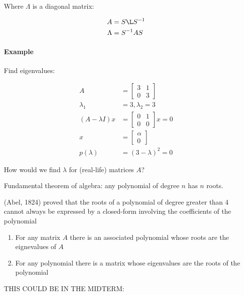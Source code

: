 Where $\Lambda$ is a diagonal matrix:

\begin{align*}
    A &= S \L S^{-1} \\
    \Lambda &= S^{-1} A S
\end{align*}

\paragraph{Example} Find eigenvalues:

\begin{align*}
    A &=
  \begin{bmatrix}
    3 & 1 \\ 0 & 3
  \end{bmatrix} \\
  \lambda_{1} &= 3, \lambda_{2} = 3 \\
  (A- \lambda I)x &=
  \begin{bmatrix}
    0 & 1 \\ 0 & 0
  \end{bmatrix}
  x = 0 \\
  x &=
  \begin{bmatrix}
    \alpha \\ 0
  \end{bmatrix} \\
  p(\lambda) &= (3-\lambda)^{2}=0
\end{align*}

How would we find $\lambda$ for (real-life) matrices $A$?

Fundamental theorem of algebra: any polynomial of degree $n$ has $n$ roots.

(Abel, 1824) proved that the roots of a polynomial of degree greater than 4 cannot always be expressed by a closed-form involving the coefficients of the polynomial

\begin{enumerate}
  \item For any matrix $A$ there is an associated polynomial whose roots are the eignevalues of $A$
  \item For any polynomial there is a matrix whose eigenvalues are the roots of the polynomial
\end{enumerate}

THIS COULD BE IN THE MIDTERM:

